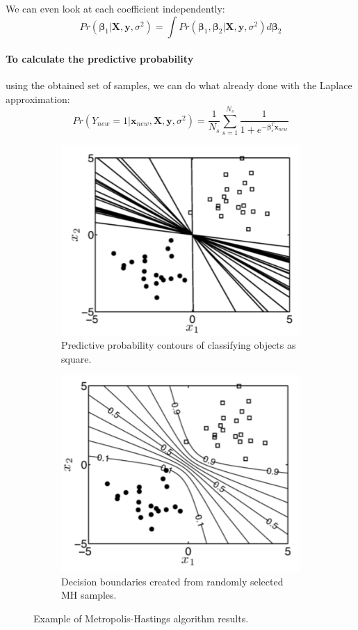 \documentclass[12pt, letterpaper]{article}
\theoremstyle{definition}
\newcommand{\X}{\mathrm{\mathbf{X}}}
\newcommand{\y}{\mathbf{y}}
\newcommand{\be}{\mathbf{\beta}}
\newcommand{\x}{\mathbf{x}}
\begin{document}
We can even look at each coefficient independently:
\begin{equation}
Pr(\be_1|\X,\y,\sigma^2) = \int Pr(\be_1,\be_2|\X,\y,\sigma^2) d\be_2
\end{equation}

\paragraph{\textbf{To calculate the predictive probability}} using the obtained set of samples, we can do what already done with the Laplace approximation:
\begin{equation}
Pr(Y_{new}=1|\x_{new}, \X,\y,\sigma^2) = \frac{1}{N_s} \sum_{s=1}^{N_s} \frac{1}{1+e^{-\be^T_s \x_{new}}}
\end{equation}

\begin{figure}
\begin{subfigure}{.47\textwidth}
\centering
\includegraphics[width=.8\linewidth]{img/MH1}
\caption{Predictive probability contours of classifying objects as square.}
\label{MH1}
\end{subfigure}
\begin{subfigure}{.47\textwidth}
\centering
\includegraphics[width=.8\linewidth]{img/MH2}
\caption{Decision boundaries created from randomly selected MH samples.}
\label{MH2}
\end{subfigure}
\caption{Example of Metropolis-Hastings algorithm results.}
\end{figure}
\end{document}
